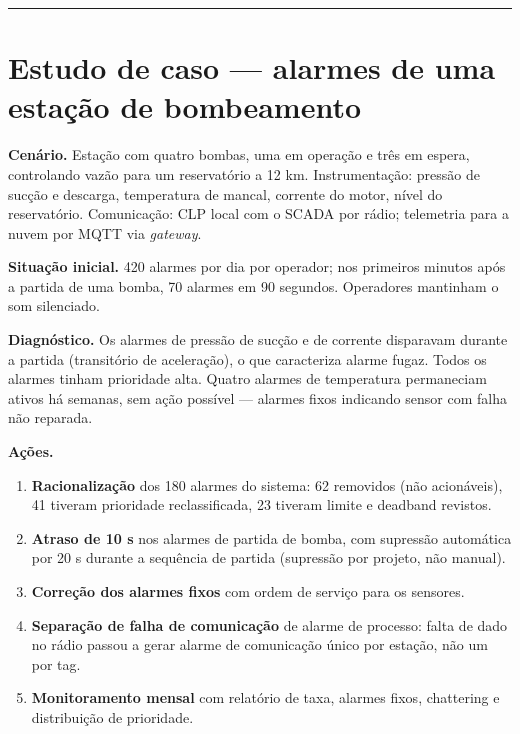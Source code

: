 \begin{center}\rule{0.5\linewidth}{0.5pt}\end{center}

\section{\texorpdfstring{Estudo de caso --- alarmes de uma estação de bombeamento}{Estudo de caso  alarmes de uma estação de bombeamento}}\label{estudo-de-caso-alarmes-de-uma-estauxe7uxe3o-de-bombeamento}

\textbf{Cenário.} Estação com quatro bombas, uma em operação e três em espera, controlando vazão para um reservatório a 12 km. Instrumentação: pressão de sucção e descarga, temperatura de mancal, corrente do motor, nível do reservatório. Comunicação: CLP local com o SCADA por rádio; telemetria para a nuvem por MQTT via \emph{gateway}.

\textbf{Situação inicial.} 420 alarmes por dia por operador; nos primeiros minutos após a partida de uma bomba, 70 alarmes em 90 segundos. Operadores mantinham o som silenciado.

\textbf{Diagnóstico.} Os alarmes de pressão de sucção e de corrente disparavam durante a partida (transitório de aceleração), o que caracteriza alarme fugaz. Todos os alarmes tinham prioridade alta. Quatro alarmes de temperatura permaneciam ativos há semanas, sem ação possível --- alarmes fixos indicando sensor com falha não reparada.

\textbf{Ações.}

\begin{enumerate}
\def\labelenumi{\arabic{enumi}.}
\tightlist
\item
  \textbf{Racionalização} dos 180 alarmes do sistema: 62 removidos (não acionáveis), 41 tiveram prioridade reclassificada, 23 tiveram limite e deadband revistos.
\item
  \textbf{Atraso de 10 s} nos alarmes de partida de bomba, com supressão automática por 20 s durante a sequência de partida (supressão por projeto, não manual).
\item
  \textbf{Correção dos alarmes fixos} com ordem de serviço para os sensores.
\item
  \textbf{Separação de falha de comunicação} de alarme de processo: falta de dado no rádio passou a gerar alarme de comunicação único por estação, não um por tag.
\item
  \textbf{Monitoramento mensal} com relatório de taxa, alarmes fixos, chattering e distribuição de prioridade.
\end{enumerate}

